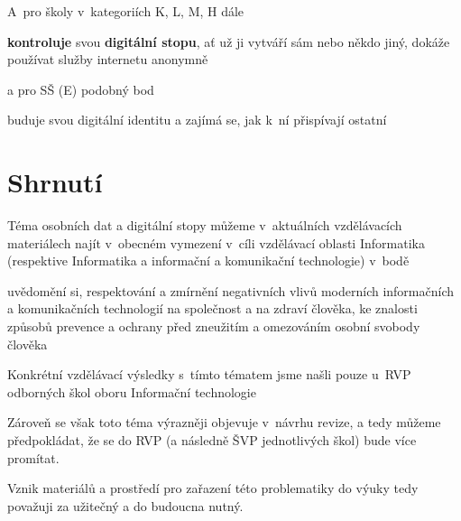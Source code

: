 A~pro školy v~kategoriích K, L, M, H dále

\begin{displayquote}
\textbf{kontroluje} svou \textbf{digitální stopu}, ať už ji vytváří sám nebo někdo jiný, dokáže používat služby internetu anonymně
\end{displayquote}

a pro SŠ (E) podobný bod

\begin{displayquote}
buduje svou digitální identitu a zajímá se, jak k~ní přispívají ostatní
\end{displayquote}

\section{Shrnutí}

Téma osobních dat a digitální stopy můžeme v~aktuálních vzdělávacích materiálech najít v~obecném vymezení v~cíli vzdělávací oblasti Informatika (respektive Informatika a informační a komunikační technologie) v~bodě

\begin{displayquote}
uvědomění si, respektování a zmírnění negativních vlivů moderních informačních a komunikačních technologií na společnost a na zdraví člověka, ke znalosti způsobů prevence a ochrany před zneužitím a omezováním osobní svobody člověka
\end{displayquote}

Konkrétní vzdělávací výsledky s~tímto tématem jsme našli pouze u~RVP odborných škol oboru Informační technologie

Zároveň se však toto téma výrazněji objevuje v~návrhu revize, a tedy můžeme předpokládat, že se do RVP (a následně ŠVP jednotlivých škol) bude více promítat.

Vznik materiálů a prostředí pro zařazení této problematiky do výuky tedy považuji za užitečný a do budoucna nutný.